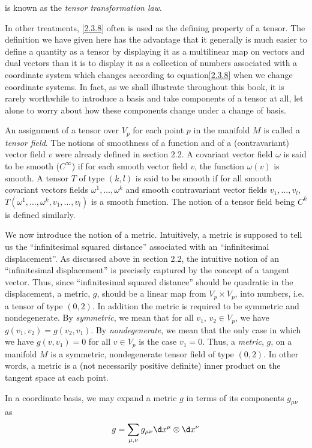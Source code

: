  is known as the \emph{tensor transformation law}.

In other treatments, \eqref{2.3.8} often is used as the defining property of a tensor. The definition we have given here has the advantage that it generally is much easier to define a quantity as a tensor by displaying it as a multilinear map on vectors and dual vectors than it is to display it as a collection of numbers associated with a coordinate system which changes according to equation\eqref{2.3.8} when we change coordinate systems. In fact, as we shall illustrate throughout this book, it is rarely worthwhile to introduce a basis and take components of a tensor at all, let alone to worry about how these components change under a change of basis.

An assignment of a tensor over $V_p$ for each point $p$ in the manifold $M$ is called a \emph{tensor field}. The notions of smoothness of a function and of a (contravariant) vector field $v$ were already defined in section 2.2. A covariant vector field $\omega$ is said to be smooth ($C^\infty$) if for each smooth vector field $v$, the function $\omega(v)$ is smooth. A tensor $T$ of type $(k, l)$ is said to be smooth if for all smooth covariant vectors fields $\omega^1,\ldots,\omega^k$ and smooth contravariant vector fields $v_1,\ldots,v_l$, $T(\omega^1,\ldots,\omega^k,v_1,\ldots,v_l)$ is a smooth function. The notion of a tensor field being $C^k$ is defined similarly.

We now introduce the notion of a metric. Intuitively, a metric is supposed to tell us the ``infinitesimal squared distance'' associated with an ``infinitesimal displacement''. As discussed above in section 2.2, the intuitive notion of an ``infinitesimal displacement'' is precisely captured by the concept of a tangent vector. Thus, since ``infinitesimal squared distance'' should be quadratic in the displacement, a metric, $g$, should be a linear map from $V_p\times V_p$, into numbers, i.e. a tensor of type $(0,2)$. In addition the metric is required to be symmetric and nondegenerate. By \emph{symmetric}, we mean that for all $v_1$, $v_2\in V_p$, we have $g(v_1,v_2)=g(v_2,v_1)$. By \emph{nondegenerate}, we mean that the only case in which we have $g(v,v_1)=0$ for all $v\in V_p$ is the case $v_1=0$. Thus, a \emph{metric}, $g$, on a manifold $M$ is a symmetric, nondegenerate tensor field of type $(0,2)$. In other words, a metric is a (not necessarily positive definite) inner product on the tangent space at each point.

In a coordinate basis, we may expand a metric $g$ in terms of its components $g_{\mu\nu}$ as
\begin{equation}
    g=\sum_{\mu,\nu}g_{\mu\nu}\d x^\mu\otimes\d x^\nu
    \label{2.3.9}
\end{equation}

